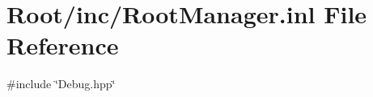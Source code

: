 \hypertarget{_root_manager_8inl}{}\section{Root/inc/\+Root\+Manager.inl File Reference}
\label{_root_manager_8inl}
{\ttfamily \#include \char`\"{}Debug.\+hpp\char`\"{}}\newline
